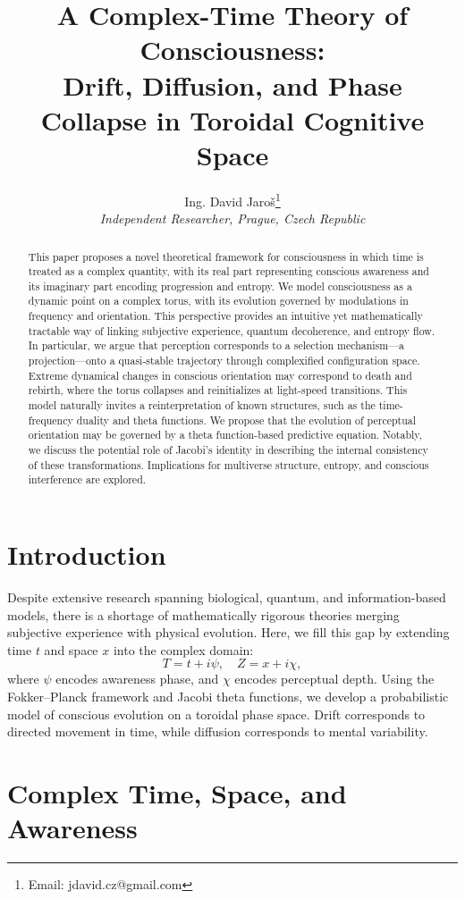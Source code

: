 \documentclass[12pt]{article}
\title{A Complex-Time Theory of Consciousness:\\ Drift, Diffusion, and Phase Collapse in Toroidal Cognitive Space}
\author{Ing. David Jaroš\thanks{Email: jdavid.cz@gmail.com} \\
\textit{Independent Researcher, Prague, Czech Republic}}
\date{}
\begin{document}
\maketitle

\begin{abstract}
This paper proposes a novel theoretical framework for consciousness in which time is treated as a complex quantity, with its real part representing conscious awareness and its imaginary part encoding progression and entropy. We model consciousness as a dynamic point on a complex torus, with its evolution governed by modulations in frequency and orientation. This perspective provides an intuitive yet mathematically tractable way of linking subjective experience, quantum decoherence, and entropy flow. In particular, we argue that perception corresponds to a selection mechanism---a projection---onto a quasi-stable trajectory through complexified configuration space. Extreme dynamical changes in conscious orientation may correspond to death and rebirth, where the torus collapses and reinitializes at light-speed transitions. This model naturally invites a reinterpretation of known structures, such as the time-frequency duality and theta functions. We propose that the evolution of perceptual orientation may be governed by a theta function-based predictive equation. Notably, we discuss the potential role of Jacobi's identity in describing the internal consistency of these transformations. Implications for multiverse structure, entropy, and conscious interference are explored.
\end{abstract}

\section{Introduction}

Despite extensive research spanning biological, quantum, and information-based models, there is a shortage of mathematically rigorous theories merging subjective experience with physical evolution. Here, we fill this gap by extending time $t$ and space $x$ into the complex domain:
\[
T = t + i\psi, \quad Z = x + i\chi,
\]
where $\psi$ encodes awareness phase, and $\chi$ encodes perceptual depth. Using the Fokker--Planck framework and Jacobi theta functions, we develop a probabilistic model of conscious evolution on a toroidal phase space. Drift corresponds to directed movement in time, while diffusion corresponds to mental variability.

\section{Complex Time, Space, and Awareness}
\end{document}
